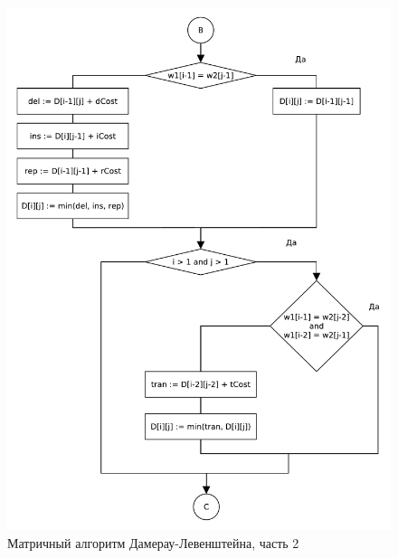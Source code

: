 \begin{figure}[H]
    \centering
    \includegraphics[scale=0.8]{pdf/damerau-levenshteain-part2.pdf}
    \caption{Матричный алгоритм Дамерау-Левенштейна, часть 2}
\end{figure}

